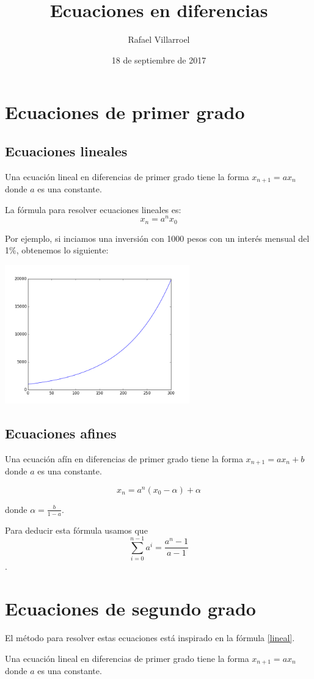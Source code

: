 \documentclass{article}
\title{Ecuaciones en diferencias}
\author{Rafael Villarroel}
\date{18 de septiembre de 2017}
\begin{document}
\maketitle

\section{Ecuaciones de primer grado}

\subsection{Ecuaciones lineales}

Una ecuación lineal en diferencias de primer grado tiene la forma $x_{n+1}=ax_n$ donde $a$ es una constante. 

La fórmula para resolver ecuaciones lineales es:
\begin{equation}
  \label{lineal}
  x_n=a^nx_0
\end{equation}

Por ejemplo, si inciamos una inversión con 1000 pesos con un interés mensual del 1\%, obtenemos lo siguiente:

\begin{center}
  \includegraphics[width=8cm]{inversion.png}
\end{center}

\subsection{Ecuaciones afines}

Una ecuación afín en diferencias de primer grado tiene la forma $x_{n+1}=ax_n+b$ donde $a$ es una constante. 

\begin{equation}
  \label{afin}
  x_n=a^n(x_0-\alpha)+\alpha
\end{equation}

donde $\alpha=\frac{b}{1-a}$. 

Para deducir esta fórmula usamos que $$\sum_{i=0}^{n-1}a^i=\frac{a^n-1}{a-1}$$.

\section{Ecuaciones de segundo grado}

El método para resolver estas ecuaciones está inspirado en la fórmula \ref{lineal}.

Una ecuación lineal en diferencias de primer grado tiene la forma $x_{n+1}=ax_n$ donde $a$ es una constante. 
\end{document}
